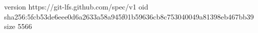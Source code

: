 version https://git-lfs.github.com/spec/v1
oid sha256:5fcb53de6eee0d6a2633a58a945f01b59636cb8c753040049a81398eb467bb39
size 5566
